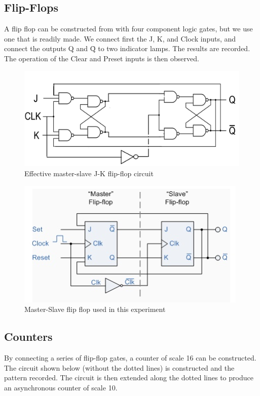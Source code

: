 \documentclass{article}
\begin{document}
\subsection*{Flip-Flops}
A flip flop can be constructed from with four component logic gates, but we use one that is readily made. We connect first the J, K, and Clock inputs, and connect the outputs Q and \=Q to two indicator lamps. The results are recorded. The operation of the Clear and Preset inputs is then observed.

\begin{figure}[h]
    \centering
    \includegraphics[scale = 0.3]{JK}
    \caption{Effective master-slave J-K flip-flop circuit}
    \label{fig:5}
\end{figure}
\begin{figure}[h!]
    \centering
    \includegraphics[scale = 0.6]{jkk}
    \caption{Master-Slave flip flop used in this experiment}
    \label{fig:6}
\end{figure}

\subsection*{Counters}
By connecting a series of flip-flop gates, a counter of scale 16 can be constructed. The circuit shown below (without the dotted lines) is constructed and the pattern recorded. The circuit is then extended along the dotted lines to produce an asynchronous counter of scale 10. 
\end{document}
